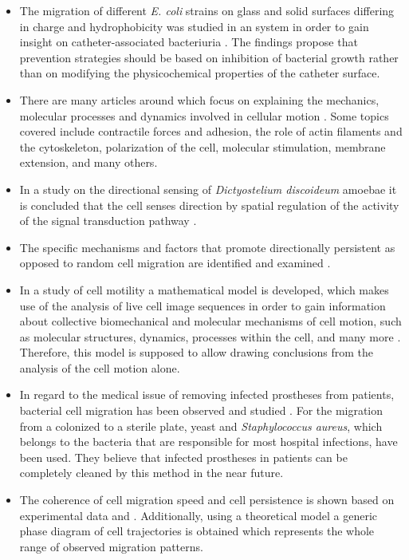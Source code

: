 \begin{itemize}
 \item %
 The migration of different \textit{E. coli} strains on glass and solid surfaces differing in charge and hydrophobicity was studied in an \vitro system in order to gain insight on catheter-associated bacteriuria \cite{harkes:1992}. The findings propose that prevention strategies should be based on inhibition of bacterial growth rather than on modifying the physicochemical properties of the catheter surface.
 \item %
 There are many articles around which focus on explaining the mechanics, molecular processes and dynamics involved in cellular motion \cite{mitchison:1996,lauffenburger:1996,horwitz:1999,horwitz:2003}. Some topics covered include contractile forces and adhesion, the role of actin filaments and the cytoskeleton, polarization of the cell, molecular stimulation, membrane extension, and many others.
 \item %
 In a study on the directional sensing of \textit{Dictyostelium discoideum} amoebae it is concluded that the cell senses direction by spatial regulation of the activity of the signal transduction pathway \cite{parent:1999}.
 \item %
 The specific mechanisms and factors that promote directionally persistent as opposed to random cell migration are identified and examined \cite{petrie:2009}.
 \item %
 In a study of cell motility a mathematical model is developed, which makes use of the analysis of live cell image sequences in order to gain information about collective biomechanical and molecular mechanisms of cell motion, such as \eg molecular structures, dynamics, processes within the cell, and many more \cite{coskun:2011}. Therefore, this model is supposed to allow drawing conclusions from the analysis of the cell motion alone.
 \item %
 In regard to the medical issue of removing infected prostheses from patients, bacterial cell migration has been observed and studied \cite{spector:2015}. For the migration from a colonized to a sterile plate, yeast and \textit{Staphylococcus aureus}, which belongs to the bacteria that are responsible for most hospital infections, have been used. They believe that infected prostheses in patients can be completely cleaned by this method in the near future.
 \item %
 The coherence of cell migration speed and cell persistence is shown based on experimental data \vitro and \vivo \cite{maiuri:2015}. Additionally, using a theoretical model a generic phase diagram of cell trajectories is obtained which represents the whole range of observed migration patterns.

\end{itemize}
